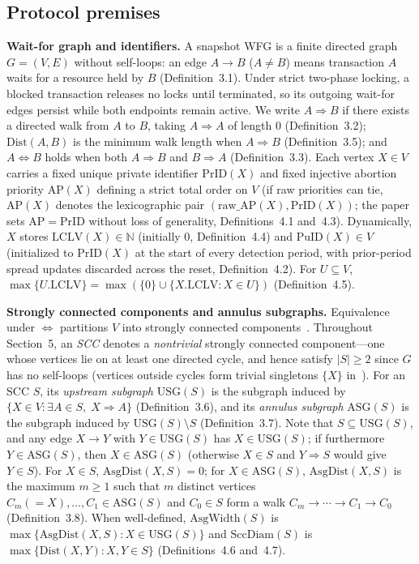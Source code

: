 \documentclass[sigconf,nonacm]{acmart}
\newcommand{\lclv}{\mathrm{LCLV}}
\newcommand{\puid}{\mathrm{PuID}}
\newcommand{\prid}{\mathrm{PrID}}
\newcommand{\ap}{\mathrm{AP}}
\newcommand{\usg}{\mathrm{USG}}
\newcommand{\asg}{\mathrm{ASG}}
\newcommand{\dist}{\mathrm{Dist}}
\newcommand{\asgdist}{\mathrm{AsgDist}}
\newcommand{\asgwidth}{\mathrm{AsgWidth}}
\newcommand{\sccdiam}{\mathrm{SccDiam}}
\begin{document}
\subsection*{Protocol premises}
\begingroup\sloppy
\setlength{\parindent}{0pt}
\setlength{\parskip}{0.25\baselineskip}
\textbf{Wait-for graph and identifiers.}
A snapshot WFG is a finite directed graph \(G=(V,E)\) without self-loops:
an edge \(A\to B\) (\(A\neq B\)) means transaction \(A\) waits for a
resource held by \(B\) (Definition~3.1). Under strict two-phase locking,
a blocked transaction releases no locks until terminated, so its
outgoing wait-for edges persist while both endpoints remain active. We
write \(A\Rightarrow B\) if there exists a directed walk from \(A\) to
\(B\), taking \(A\Rightarrow A\) of length \(0\) (Definition~3.2);
\(\dist(A,B)\) is the minimum walk length when \(A\Rightarrow B\)
(Definition~3.5); and \(A\Leftrightarrow B\) holds when both
\(A\Rightarrow B\) and \(B\Rightarrow A\) (Definition~3.3). Each vertex
\(X\in V\) carries a fixed unique private identifier \(\prid(X)\) and
fixed injective abortion priority \(\ap(X)\) defining a strict total
order on \(V\) (if raw priorities can tie, \(\ap(X)\) denotes the
lexicographic pair \((\mathrm{raw\_AP}(X),\prid(X))\); the paper sets
\(\ap=\prid\) without loss of generality, Definitions~4.1 and~4.3).
Dynamically, \(X\) stores \(\lclv(X)\in\mathbb{N}\) (initially \(0\),
Definition~4.4) and \(\puid(X)\in V\) (initialized to \(\prid(X)\) at
the start of every detection period, with prior-period spread updates
discarded across the reset, Definition~4.2). For \(U\subseteq V\),
\(\max\{U.\lclv\}=\max(\{0\}\cup\{X.\lclv : X\in U\})\)
(Definition~4.5).

\textbf{Strongly connected components and annulus subgraphs.}
Equivalence under \(\Leftrightarrow\) partitions \(V\) into strongly
connected components~\cite{tarjan}. Throughout Section~5, an \emph{SCC}
denotes a \emph{nontrivial} strongly connected component---one whose
vertices lie on at least one directed cycle, and hence satisfy
\(|S|\ge 2\) since \(G\) has no self-loops (vertices outside cycles form
trivial singletons \(\{X\}\) in~\cite[\S3.2]{lclplus}). For an SCC \(S\),
its \emph{upstream subgraph} \(\usg(S)\) is the subgraph induced by
\(\{X\in V : \exists A\in S,\; X\Rightarrow A\}\) (Definition~3.6), and
its \emph{annulus subgraph} \(\asg(S)\) is the subgraph induced by
\(\usg(S)\setminus S\) (Definition~3.7). Note that \(S\subseteq\usg(S)\),
and any edge \(X\to Y\) with \(Y\in\usg(S)\) has \(X\in\usg(S)\); if
furthermore \(Y\in\asg(S)\), then \(X\in\asg(S)\) (otherwise \(X\in S\)
and \(Y\Rightarrow S\) would give \(Y\in S\)). For \(X\in S\),
\(\asgdist(X,S)=0\); for \(X\in\asg(S)\), \(\asgdist(X,S)\) is the
maximum \(m\ge 1\) such that \(m\) distinct vertices
\(C_m(=X),\allowbreak \dots,\allowbreak C_1\in\asg(S)\) and \(C_0\in S\)
form a walk \(C_m\to\cdots\to C_1\to C_0\) (Definition~3.8). When
well-defined, \(\asgwidth(S)\) is \(\max\{\asgdist(X,S) : X\in\usg(S)\}\)
and \(\sccdiam(S)\) is \(\max\{\dist(X,Y) : X,Y\in S\}\)
(Definitions~4.6 and~4.7).
\end{document}
